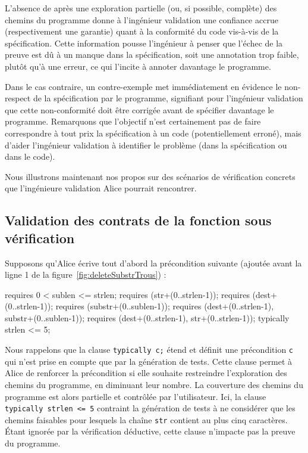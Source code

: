 L'absence de \NCCE après une exploration partielle (ou, si possible, complète)
des chemins du programme donne à l'ingénieur validation une confiance accrue
(respectivement une garantie) quant à la conformité du code vis-à-vis de la
spécification.
Cette information pousse l'ingénieur à penser que l'échec de la preuve est dû à
un manque dans la spécification, soit une annotation trop faible, plutôt qu'à
une erreur, ce qui l'incite à annoter davantage le programme.

Dans le cas contraire, un contre-exemple met immédiatement en évidence le
non-respect de la spécification par le programme, signifiant pour l'ingénieur
validation que cette non-conformité doit être corrigée avant de spécifier
davantage le programme.
Remarquons que l'objectif n'est certainement pas de faire correspondre à tout
prix la spécification à un code (potentiellement erroné), mais d'aider
l'ingénieur validation à identifier le problème (dans la spécification ou dans
le code).

Nous illustrons maintenant nos propos sur des scénarios de vérification
concrets que l'ingénieure validation Alice pourrait rencontrer.


\subsection{Validation des contrats de la fonction sous vérification}
\label{sec:ncd-early}


Supposons qu'Alice écrive tout d'abord la précondition suivante (ajoutée avant
la ligne 1 de la figure~\ref{fig:deleteSubstrTrous}) :

\begin{pretty-codeACSL}
requires 0 < sublen <= strlen;
requires \valid(str+(0..strlen-1));
requires \valid(dest+(0..strlen-1));
requires \valid(substr+(0..sublen-1));
requires \separated(dest+(0..strlen-1), substr+(0..sublen-1));
requires \separated(dest+(0..strlen-1), str+(0..strlen-1));
typically strlen <= 5;
\end{pretty-codeACSL}

Nous rappelons que la clause \lstinline{typically c;} étend \eacsl et définit
une précondition \lstinline'c' qui n'est prise en compte que par la génération
de tests.
Cette clause permet à Alice de renforcer la précondition si elle souhaite
restreindre l'exploration des chemins du programme, en diminuant leur nombre.
La couverture des chemins du programme est alors partielle et contrôlée par
l'utilisateur.
Ici, la clause \lstinline'typically strlen <= 5' contraint la génération de
tests à ne considérer que les chemins faisables pour lesquels la chaîne
\lstinline'str' contient au plus cinq caractères.
Étant ignorée par la vérification déductive, cette clause n'impacte pas la
preuve du programme.

